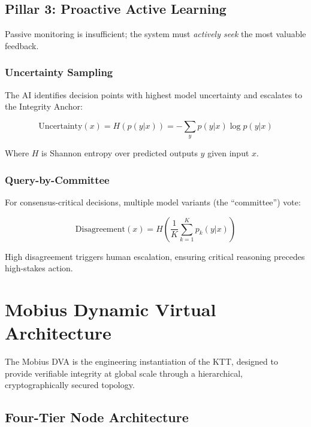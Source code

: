 \documentclass[11pt,letterpaper]{article}
\begin{document}
\subsection{Pillar 3: Proactive Active Learning}

Passive monitoring is insufficient; the system must \textit{actively seek} the most valuable feedback.

\subsubsection{Uncertainty Sampling}

The AI identifies decision points with highest model uncertainty and escalates to the Integrity Anchor:

\begin{equation}
\text{Uncertainty}(x) = H(p(y|x)) = -\sum_{y} p(y|x) \log p(y|x)
\label{eq:uncertainty}
\end{equation}

Where $H$ is Shannon entropy over predicted outputs $y$ given input $x$.

\subsubsection{Query-by-Committee}

For consensus-critical decisions, multiple model variants (the ``committee'') vote:

\begin{equation}
\text{Disagreement}(x) = H\left(\frac{1}{K}\sum_{k=1}^K p_k(y|x)\right)
\label{eq:qbc}
\end{equation}

High disagreement triggers human escalation, ensuring critical reasoning precedes high-stakes action.

\section{Mobius Dynamic Virtual Architecture}
\label{sec:architecture}

The Mobius DVA is the engineering instantiation of the KTT, designed to provide verifiable integrity at global scale through a hierarchical, cryptographically secured topology.

\subsection{Four-Tier Node Architecture}
\end{document}
